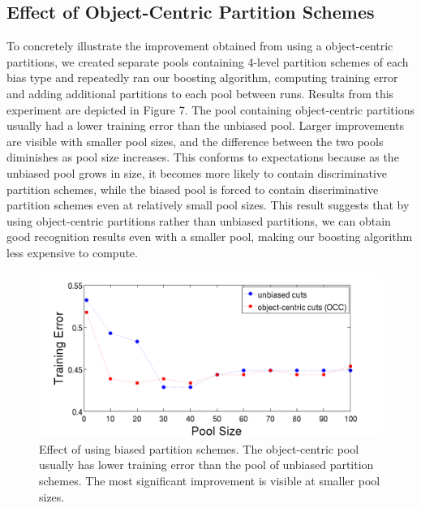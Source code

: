 \documentclass{bmvc2k}
\begin{document}
  

  \subsection{Effect of Object-Centric Partition Schemes}
  To concretely illustrate the improvement obtained from using a
  object-centric partitions, we created separate pools containing 4-level
  partition schemes of each bias type and
  repeatedly ran our boosting algorithm, computing training error and adding additional
  partitions to each pool between runs. Results from this experiment are
  depicted in Figure 7. The pool containing object-centric partitions 
  usually had a lower training error than the unbiased pool.
  Larger improvements are visible with smaller pool sizes, and the difference
  between the two pools diminishes as pool size increases. This conforms to
  expectations because as the unbiased pool grows in size, it becomes more
  likely to contain discriminative partition schemes, while the biased pool
  is forced to contain discriminative partition schemes even at relatively
  small pool sizes. This result suggests that by using object-centric
  partitions rather than unbiased partitions, we can obtain good recognition
  results even with a smaller pool, making our boosting algorithm less expensive
  to compute.
 
  \begin{figure}[t]
		\begin{center}
			  \includegraphics[width=1.0\linewidth]{figures/trainerror.png}
		\end{center}
		   \caption{Effect of using biased partition schemes. The object-centric
         pool
       usually has lower training error
       than the pool of unbiased partition schemes. The most significant
     improvement is visible at smaller pool sizes.}
				\label{fig:long}
				\label{fig:onecol}
	\end{figure}
	

\end{document}
